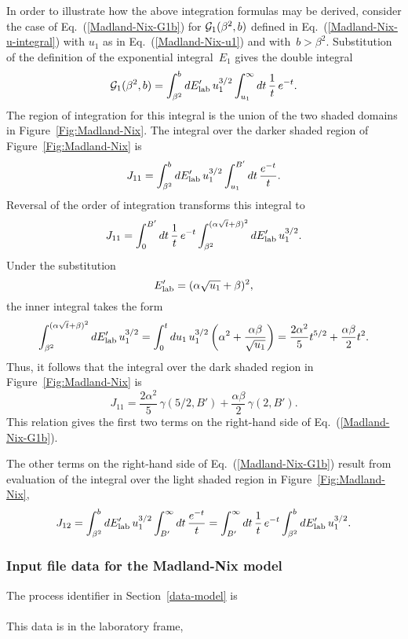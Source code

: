 \begin{figure}

\end{figure}

In order to illustrate how the above integration formulas may be 
derived, consider the case of Eq.~(\ref{Madland-Nix-G1b})
for ${\cal G}_1( \beta^2, b )$ defined in 
Eq.~(\ref{Madland-Nix-u-integral}) with $u_1$ as in
Eq.~(\ref{Madland-Nix-u1}) and with~$b > \beta^2$.  Substitution
of the definition of the exponential integral~$E_1$ gives the double
integral
$$
   {\cal G}_1( \beta^2, b ) = \int_{\beta^2}^b dE_{\text{lab}}'  \,
      u_1^{3/2} \int_{u_1}^\infty dt \, \frac{1}{t} \, e^{-t}.
$$
The region of integration for this integral is the union of the
two shaded domains in Figure~\ref{Fig:Madland-Nix}.
The integral over the darker shaded region of Figure~\ref{Fig:Madland-Nix} is
$$
  J_{11} = \int_{\beta^2}^b dE_{\text{lab}}'  \, u_1^{3/2}\int_{u_1}^{B'} dt\, \frac { e^{-t}}{t}.
$$
Reversal of the order of integration transforms this integral to
$$
  J_{11} = \int_0^{B'} dt\, \frac{1}{t} \,e^{-t}
    \int_{\beta^2}^{(\alpha\sqrt{t} + \beta)^2}
       dE_{\text{lab}}' \, u_1^{3/2}.
$$
Under the substitution
\begin{equation*}
  E_{\text{lab}}'  = (\alpha \sqrt{u_1} + \beta)^2,
\end{equation*}
the inner integral takes the form
$$
  \int_{\beta^2}^{(\alpha\sqrt{t} + \beta)^2}
       dE_{\text{lab}}' \, u_1^{3/2} =
   \int_0^t du_1 \, u_1^{3/2}\left( 
       \alpha^2 + \frac{\alpha\beta}{\sqrt{u_1}} 
  \right) =
    \frac{2\alpha^2}{5}t^{5/2} + \frac{\alpha\beta}{2}t^2.
$$
Thus, it follows that the integral over the dark shaded region in
Figure~\ref{Fig:Madland-Nix} is
\begin{equation*}
  J_{11} = 
    \frac{2\alpha^2}{5} \, \gamma(5/2, B') + \frac{ \alpha\beta}{2} \, \gamma(2, B').
\end{equation*}
This relation gives the first two terms on the right-hand side
of Eq.~(\ref{Madland-Nix-G1b}).

The other terms on the right-hand side of Eq.~(\ref{Madland-Nix-G1b})
result from evaluation of the integral over the light shaded region in
Figure~\ref{Fig:Madland-Nix},
$$
J_{12} = \int_{\beta^2}^b dE_{\text{lab}}'  \, u_1^{3/2} \int_{B'}^\infty dt\, \frac {e^{-t}}{t}
 = \int_{B'}^\infty dt\, \frac{1}{t} \, e^{-t}
    \int_{\beta^2}^{b}
       dE_{\text{lab}}' \, u_1^{3/2}.
$$  

\subsubsection{Input file data for the Madland-Nix model}
The process identifier in Section~\ref{data-model} is\\
  \\
This data is in the laboratory frame,\\

